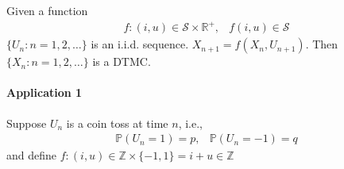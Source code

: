 \begin{theorem}
Given a function
\[
\begin{array}{ll}
f:(i,u)\in\mathcal{S}\times\mathbb{R}^+,
&
f(i,u)\in\mathcal{S}
\end{array}
\]
$\{U_n: n=1,2,\dots\}$ is an i.i.d. sequence. $X_{n+1} = f(X_n,U_{n+1})$. Then $\{X_n: n=1,2,\dots\}$ is a DTMC.
\end{theorem}

\paragraph{Application 1}
Suppose $U_n$ is a coin toss at time $n$, i.e., 
\[
\begin{array}{ll}
\mathbb{P}(U_n = 1) = p,
&
\mathbb{P}(U_n = -1) = q
\end{array}
\]
and define $f: (i,u)\in\mathbb{Z}\times\{-1,1\} = i+u\in\mathbb{Z}$














